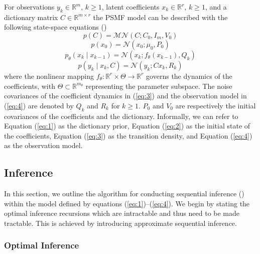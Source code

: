 \documentclass{mldsmsc}
\begin{document}
For observations $y_k \in \mathbb{R}^{m}$, $k \geq 1$, latent coefficients $x_k \in \mathbb{R}^{r}$, $k \geq 1$, and a dictionary matrix $C \in \mathbb{R}^{m \times r}$ the PSMF model can be described with the following state-space equations (\cite{akyildiz2021probabilistic})
\begin{equation} \label{eq:1}
    p(C) = \mathcal{MN}(C; C_0, I_m, V_0)
\end{equation}
\begin{equation} \label{eq:2}
    p(x_0) = \mathcal{N}(x_0; \mu_0, P_0)
\end{equation}
\begin{equation} \label{eq:3}
    p_{\theta}(x_k \mid x_{k-1}) = \mathcal{N}(x_k; f_{\theta}(x_{k-1}), Q_k)
\end{equation}
\begin{equation} \label{eq:4}
    p(y_k \mid x_k, C) = \mathcal{N}(y_k; Cx_k, R_k)
\end{equation}
where the nonlinear mapping $f_{\theta} : \mathbb{R}^{r} \times \Theta \rightarrow \mathbb{R}^{r}$ governs the dynamics of the coefficients, with $\Theta \subset \mathbb{R}^{m_{\theta}}$ representing the parameter subspace. The noise covariances of the coefficient dynamics in (\ref{eq:3}) and the observation model in (\ref{eq:4}) are denoted by $Q_k$ and $R_k$ for $k \geq 1$. $P_0$ and $V_0$ are respectively the initial covariances of the coefficients and the dictionary. Informally, we can refer to Equation (\ref{eq:1}) as the dictionary prior, Equation (\ref{eq:2}) as the initial state of the coefficients, Equation (\ref{eq:3}) as the transition density, and Equation (\ref{eq:4}) as the observation model.

\subsection{Inference}

In this section, we outline the algorithm for conducting sequential inference (\cite{akyildiz2021probabilistic}) within the model defined by equations (\ref{eq:1})–(\ref{eq:4}). We begin by stating the optimal inference recursions which are intractable and thus need to be made tractable. This is achieved by introducing approximate sequential inference.

\subsubsection{Optimal Inference}
\end{document}
